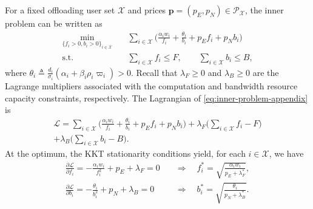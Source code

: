 \documentclass[lettersize,journal]{IEEEtran}
\begin{document}
For a fixed offloading user set $\mathcal{X}$ and prices $\boldsymbol{p}=(p_E,p_N)\in\mathcal{P}_{\mathcal{X}}$, the inner problem can be written as
\begin{equation}\label{eq:inner-problem-appendix}
\begin{aligned}
\min_{\{f_i>0,b_i>0\}_{i\in\mathcal{X}}}\quad
&\sum_{i\in\mathcal{X}}
\Big(
\frac{\alpha_i w_i}{f_i}+\frac{\theta_i}{b_i}+p_E f_i+p_N b_i
\Big)\\
\text{s.t.}\quad
&\sum_{i\in\mathcal{X}} f_i \le F,\qquad
\sum_{i\in\mathcal{X}} b_i \le B,
\end{aligned}
\end{equation}
where $\theta_i \triangleq \frac{d_i}{\sigma_i}(\alpha_i+\beta_i\rho_i\varpi_i)>0$.
Recall that $\lambda_F\ge 0$ and $\lambda_B\ge 0$ are the Lagrange multipliers associated with the computation and bandwidth resource capacity constraints, respectively.
The Lagrangian of \eqref{eq:inner-problem-appendix} is
\begin{equation}
    \begin{split}
        \mathcal{L}
=
\sum_{i\in\mathcal{X}}
\Big(
\frac{\alpha_i w_i}{f_i}+\frac{\theta_i}{b_i}+p_E f_i+p_N b_i
\Big)
+\lambda_F\Big(\sum_{i\in\mathcal{X}} f_i - F\Big)\\
+\lambda_B\Big(\sum_{i\in\mathcal{X}} b_i - B\Big).
    \end{split}
\end{equation}
At the optimum, the KKT stationarity conditions yield, for each $i\in\mathcal{X}$, we have
\begin{align}
\frac{\partial \mathcal{L}}{\partial f_i}= -\frac{\alpha_i w_i}{f_i^2} + p_E + \lambda_F = 0
\quad &\Longrightarrow\quad
f_i^*=\sqrt{\frac{\alpha_i w_i}{p_E+\lambda_F^*}}, \label{eq:kkt-fi}\\
\frac{\partial \mathcal{L}}{\partial b_i}= -\frac{\theta_i}{b_i^2} + p_N + \lambda_B = 0
\quad &\Longrightarrow\quad
b_i^*=\sqrt{\frac{\theta_i}{p_N+\lambda_B^*}}. \label{eq:kkt-bi}
\end{align}
\end{document}

